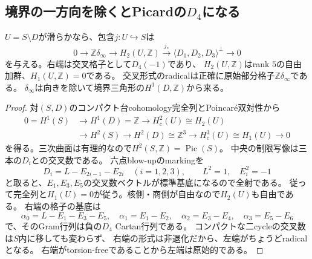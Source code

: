 \subsection{境界の一方向を除くとPicardの\texorpdfstring{$D_4$}{D4}になる}
\begin{theorem}[整数係数の比較完全列]
\label{thm:lg-integral-picard-sequence}
$U=S\setminus D$が滑らかなら、包含$j:U\hookrightarrow S$は
\begin{equation}\label{eq:lg-integral-sequence}
 0\longrightarrow\mathbb Z\delta_\infty
 \longrightarrow H_2(U,\mathbb Z)
 \xrightarrow{j_*}\langle D_1,D_2,D_3\rangle^\perp
 \longrightarrow0
\end{equation}
を与える。右端は交叉格子として$D_4(-1)$であり、
$H_2(U,\mathbb Z)$はrank $5$の自由加群、$H_1(U,\mathbb Z)=0$である。
交叉形式のradicalは正確に原始部分格子$\mathbb Z\delta_\infty$である。
$\delta_\infty$は向きを除いて境界三角形の$H^1(D,\mathbb Z)$から来る。
\end{theorem}
\begin{proof}
対$(S,D)$のコンパクト台cohomology完全列とPoincar\'e双対性から
\[
\begin{aligned}
 0=H^1(S)&\longrightarrow H^1(D)=\mathbb Z
 \longrightarrow H_c^2(U)\cong H_2(U)\\
 &\longrightarrow H^2(S)\longrightarrow H^2(D)\cong\mathbb Z^3
 \longrightarrow H_c^3(U)\cong H_1(U)\longrightarrow0
\end{aligned}
\]
を得る。三次曲面は有理的なので$H^2(S,\mathbb Z)=\operatorname{Pic}(S)$。
中央の制限写像は三本の$D_i$との交叉数である。
六点blow-upのmarkingを
\[
 D_i=L-E_{2i-1}-E_{2i}\quad(i=1,2,3),\qquad
 L^2=1,\quad E_i^2=-1
\]
と取ると、$E_1,E_3,E_5$の交叉数ベクトルが標準基底になるので全射である。
従って完全列と$H_1(U)=0$が従う。核側・商側が自由なので$H_2(U)$も自由である。
右端の格子の基底は
\[
 \alpha_0=L-E_1-E_3-E_5,\quad
 \alpha_1=E_1-E_2,\quad\alpha_2=E_3-E_4,\quad\alpha_3=E_5-E_6
\]
で、そのGram行列は負の$D_4$ Cartan行列である。
コンパクトな二cycleの交叉数は$S$内に移しても変わらず、
右端の形式は非退化だから、左端がちょうどradicalとなる。
右端がtorsion-freeであることから左端は原始的である。
\end{proof}

